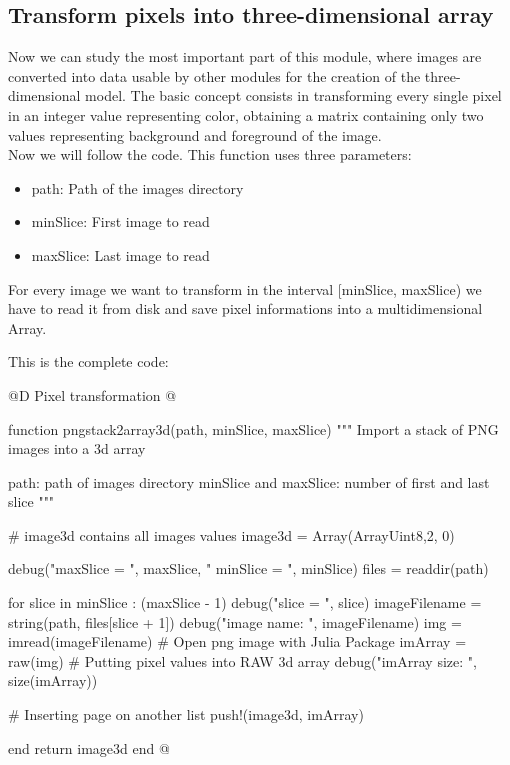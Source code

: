 \documentclass[11pt,oneside]{article}	%
\begin{document}
\subsection{Transform pixels into three-dimensional array}\label{sec:transformation}

Now we can study the most important part of this module, where images are converted into data usable by other modules for the creation of the three-dimensional model. The basic concept consists in transforming every single pixel in an integer value representing color, obtaining a matrix containing only two values representing background and foreground of the image.\\
Now we will follow the code. This function uses three parameters:

\begin{itemize}
 \item path: Path of the images directory
 \item minSlice: First image to read
 \item maxSlice: Last image to read
\end{itemize}

For every image we want to transform in the interval [minSlice, maxSlice) we have to read it from disk and save pixel informations into a multidimensional Array.

This is the complete code:

@D Pixel transformation
@{function pngstack2array3d(path, minSlice, maxSlice)
  """
  Import a stack of PNG images into a 3d array

  path: path of images directory
  minSlice and maxSlice: number of first and last slice
  """

  # image3d contains all images values
  image3d = Array(Array{Uint8,2}, 0)

  debug("maxSlice = ", maxSlice, " minSlice = ", minSlice)
  files = readdir(path)

  for slice in minSlice : (maxSlice - 1)
    debug("slice = ", slice)
    imageFilename = string(path, files[slice + 1])
    debug("image name: ", imageFilename)
    img = imread(imageFilename) # Open png image with Julia Package
    imArray = raw(img) # Putting pixel values into RAW 3d array
    debug("imArray size: ", size(imArray))

    # Inserting page on another list
    push!(image3d, imArray)

  end
  return image3d
end
@}

\end{document}

